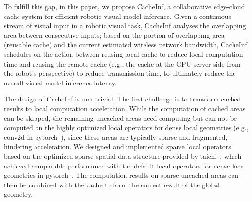 


To fulfill this gap, in this paper, we propose CacheInf, a collaborative edge-cloud cache system for efficient robotic visual model inference.
Given a continuous stream of visual input in a robotic visual task, CacheInf analyses the overlapping area between consecutive inputs;
based on the portion of overlapping area (reusable cache) and the current estimated wireless network bandwidth, CacheInf schedules on the action between reusing local cache to reduce local computation time and reusing the remote cache (e.g., the cache at the GPU server side from the robot's perspective) to reduce transmission time, to ultimately reduce the overall visual model inference latency.

The design of CacheInf is non-trivial.
The first challenge is to transform cached results to local computation acceleration.
While the computation of cached areas can be skipped, the remaining uncached areas need computing but can not be computed on the highly optimized local operators for dense local geometries (e.g., conv2d in pytorch~\cite{paszke2017automatic}), since these areas are typically sparse and fragmented, hindering acceleration.
We designed and implemented sparse local operators based on the optimized sparse spatial data structure provided by taichi~\cite{taichi}, which achieved comparable performance with the default local operators for dense local geometries in pytorch~\cite{paszke2017automatic}.
The computation results on sparse uncached areas can then be combined with the cache to form the correct result of the global geometry.

